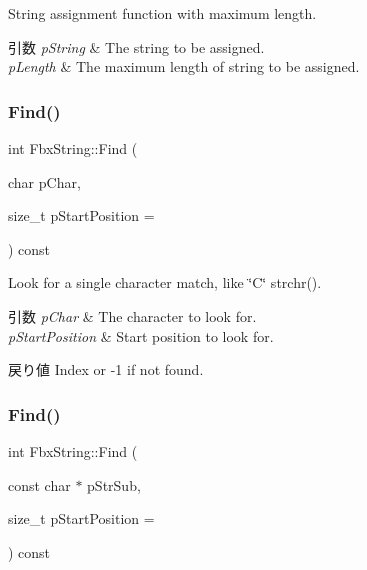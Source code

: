 String assignment function with maximum length. 
\begin{DoxyParams}{引数}
{\em p\+String} & The string to be assigned. \\
\hline
{\em p\+Length} & The maximum length of string to be assigned. \\
\hline
\end{DoxyParams}
\mbox{\label{class_fbx_string_a6089c51dcf07542e8ac5401a2883d81d}} 
\subsubsection{\texorpdfstring{Find()}{Find()}\hspace{0.1cm}{\footnotesize\ttfamily [1/2]}}
{\footnotesize\ttfamily int Fbx\+String\+::\+Find (\begin{DoxyParamCaption}\item[{char}]{p\+Char,  }\item[{size\+\_\+t}]{p\+Start\+Position = {} }\end{DoxyParamCaption}) const}

Look for a single character match, like \char`\"{}\+C\char`\"{} strchr(). 
\begin{DoxyParams}{引数}
{\em p\+Char} & The character to look for. \\
\hline
{\em p\+Start\+Position} & Start position to look for. \\
\hline
\end{DoxyParams}
\begin{DoxyReturn}{戻り値}
Index or -\/1 if not found. 
\end{DoxyReturn}
\mbox{\label{class_fbx_string_a1e8f4ebd8ffd89a77b093071cad9bd2c}} 
\subsubsection{\texorpdfstring{Find()}{Find()}\hspace{0.1cm}{\footnotesize\ttfamily [2/2]}}
{\footnotesize\ttfamily int Fbx\+String\+::\+Find (\begin{DoxyParamCaption}\item[{const char $\ast$}]{p\+Str\+Sub,  }\item[{size\+\_\+t}]{p\+Start\+Position = {} }\end{DoxyParamCaption}) const}

